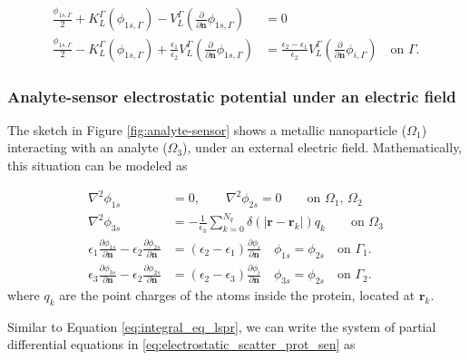 \begin{align} \label{eq:integral_eq_lspr}
\frac{\phi_{1s,\Gamma}}{2}+ K_{L}^{\Gamma}(\phi_{1s,\Gamma}) - V_{L}^{\Gamma} \left(\frac{\partial}{\partial \mathbf{n}}\phi_{1s,\Gamma} \right) &= 0  \nonumber \\
\frac{\phi_{1s,\Gamma}}{2} - K_{L}^{\Gamma}(\phi_{1s,\Gamma}) + \frac{\epsilon_1}{\epsilon_2}V_{L}^{\Gamma} \left( \frac{\partial}{\partial \mathbf{n}} \phi_{1s,\Gamma}  \right) &=
 \frac{\epsilon_2-\epsilon_1}{\epsilon_2}V_{L}^{\Gamma}\left( \frac{\partial}{\partial \mathbf{n}} \phi_{i,\Gamma} \right)\quad \text{on $\Gamma$.}
\end{align}


\subsubsection{Analyte-sensor electrostatic potential under an electric field}

The sketch in Figure \ref{fig:analyte-sensor} shows a metallic nanoparticle ($\Omega_1$) interacting with an analyte ($\Omega_3$), under an external electric field.
Mathematically, this situation can be modeled as

\begin{align}\label{eq:electrostatic_scatter_prot_sen}
\nabla^2 \phi_{1s} &= 0, \qquad \nabla^2 \phi_{2s} = 0 \qquad\text{on $\Omega_1$, $\Omega_2$} \nonumber\\
\nabla^2 \phi_{3s} &= -\frac{1}{\epsilon_3} \sum_{k=0}^{N_q} \delta(|\mathbf{r}-\mathbf{r}_k|) q_k \qquad\text{on $\Omega_3$} \nonumber \\
\epsilon_1\frac{\partial\phi_{1s}}{\partial \mathbf{n}} - \epsilon_2\frac{\partial\phi_{2s}}{\partial\mathbf{n}} &= (\epsilon_2-\epsilon_1)\frac{\partial\phi_i}{\partial\mathbf{n}} \quad \phi_{1s} = \phi_{2s} \quad \text{on $\Gamma_1$}. \nonumber\\
\epsilon_3\frac{\partial\phi_{3s}}{\partial \mathbf{n}} - \epsilon_2\frac{\partial\phi_{2s}}{\partial\mathbf{n}} &= (\epsilon_2-\epsilon_3)\frac{\partial\phi_i}{\partial\mathbf{n}} \quad \phi_{3s} = \phi_{2s} \quad \text{on $\Gamma_2$}.
\end{align}
%
where $q_k$ are the point charges of the atoms inside the protein, located at $\mathbf{r}_k$.

Similar to Equation \eqref{eq:integral_eq_lspr}, we can write the system of partial differential equations in \eqref{eq:electrostatic_scatter_prot_sen} as

